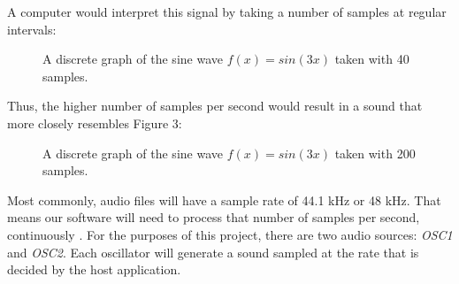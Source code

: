 \documentclass[12pt]{article}
\begin{document}
\newpage

A computer would interpret this signal by taking a number of samples at regular intervals:

\begin{figure}[h] %
	\begin{center}
		\caption{A discrete graph of the sine wave \(f(x) = sin(3x)\) taken with 40 samples.}
	\end{center}
\end{figure}

Thus, the higher number of samples per second would result in a sound that more closely resembles Figure 3:

\begin{figure}[h] %
	\begin{center}
		\caption{A discrete graph of the sine wave \(f(x) = sin(3x)\) taken with 200 samples.}
	\end{center}
\end{figure}


Most commonly, audio files will have a sample rate of 44.1 kHz or 48 kHz. That means our software will need to process that number of samples per second, continuously \cite{Doumler}. For the purposes of this project, there are two audio sources: \textit{OSC1} and \textit{OSC2}. Each oscillator will generate a sound sampled at the rate that is decided by the host application.
\end{document}
